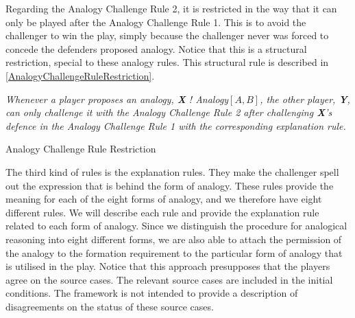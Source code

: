 		Regarding the Analogy Challenge Rule 2, it is restricted in the way that it can only be played after the Analogy Challenge Rule 1. This is to avoid the challenger to win the play, simply because the challenger never was forced to concede the defenders proposed analogy. Notice that this is a structural restriction, special to these analogy rules. This structural rule is described in \autoref{AnalogyChallengeRuleRestriction}.
		
					\begin{Restriction}[H] 
					\centering
					\begin{minipage}{0.9\textwidth}      		
               			\textit{Whenever a player proposes an analogy, \textnormal{\textbf{X} ! Analogy$[A,B]$}, the other player, \textnormal{\textbf{Y}}, can only challenge it with the Analogy Challenge Rule 2 after challenging \textnormal{\textbf{X}}'s defence in the Analogy Challenge Rule 1 with the corresponding explanation rule.}
               			\end{minipage}
               		\caption{Analogy Challenge Rule Restriction}
                	\label{AnalogyChallengeRuleRestriction}
					\end{Restriction}			
			
		The third kind of rules is the explanation rules. They make the challenger spell out the expression that is behind the form of analogy. These rules provide the meaning for each of the eight forms of analogy, and we therefore have eight different rules. We will describe each rule and provide the explanation rule related to each form of analogy. Since we distinguish the procedure for analogical reasoning into eight different forms, we are also able to attach the permission of the analogy to the formation requirement to the particular form of analogy that is utilised in the play. Notice that this approach presupposes that the players agree on the source cases. The relevant source cases are included in the initial conditions. The framework is not intended to provide a description of disagreements on the status of these source cases. 
		
